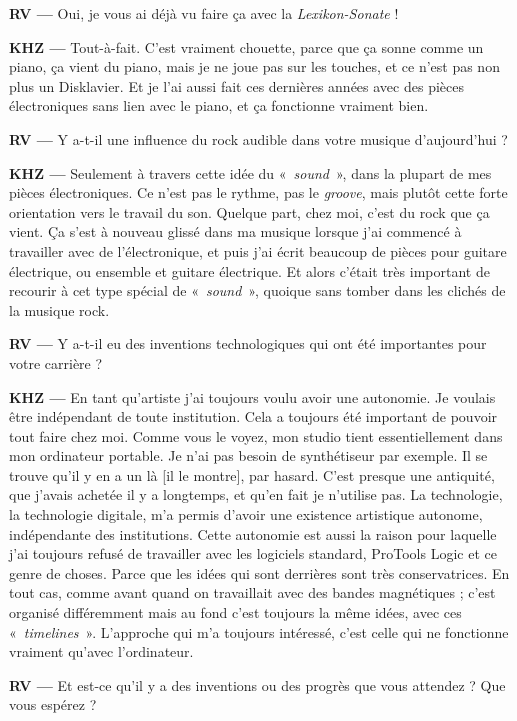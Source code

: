 \documentclass[a4paper,12pt]{article}
\newcommand{\guill}[1]{«~#1~»}
\begin{document}
\textbf{RV ---} Oui, je vous ai déjà vu faire ça avec la \emph{Lexikon-Sonate} !

\textbf{KHZ ---} Tout-à-fait. C'est vraiment chouette, parce que ça sonne comme un piano, ça vient du piano, mais je ne joue pas sur les touches, et ce n'est pas non plus un Disklavier. Et je l'ai aussi fait ces dernières années avec des pièces électroniques sans lien avec le piano, et ça fonctionne vraiment bien.

\textbf{RV ---} Y a-t-il une influence du rock audible dans votre musique d'aujourd'hui ?

\textbf{KHZ ---} Seulement à travers cette idée du \guill{\emph{sound}}, dans la plupart de mes pièces électroniques. Ce n'est pas le rythme, pas le \emph{groove}, mais plutôt cette forte orientation vers le travail du son. Quelque part, chez moi, c'est du rock que ça vient. Ça s'est à nouveau glissé dans ma musique lorsque j'ai commencé à travailler avec de l'électronique, et puis j'ai écrit beaucoup de pièces pour guitare électrique, ou ensemble et guitare électrique. Et alors c'était très important de recourir à cet type spécial de \guill{\emph{sound}}, quoique sans tomber dans les clichés de la musique rock.

\textbf{RV ---} Y a-t-il eu des inventions technologiques qui ont été importantes pour votre carrière ?

\textbf{KHZ ---} En tant qu'artiste j'ai toujours voulu avoir une autonomie. Je voulais être indépendant de toute institution. Cela a toujours été important de pouvoir tout faire chez moi. Comme vous le voyez, mon studio tient essentiellement dans mon ordinateur portable. Je n'ai pas besoin de synthétiseur par exemple. Il se trouve qu'il y en a un là [il le montre], par hasard. C'est presque une antiquité, que j'avais achetée il y a longtemps, et qu'en fait je n'utilise pas. La technologie, la technologie digitale, m'a permis d'avoir une existence artistique autonome, indépendante des institutions. Cette autonomie est aussi la raison pour laquelle j'ai toujours refusé de travailler avec les logiciels standard, ProTools Logic et ce genre de choses. Parce que les idées qui sont derrières sont très conservatrices. En tout cas, comme avant quand on travaillait avec des bandes magnétiques ; c'est organisé différemment mais au fond c'est toujours la même idées, avec ces \guill{\emph{timelines}}. L'approche qui m'a toujours intéressé, c'est celle qui ne fonctionne vraiment qu'avec l'ordinateur.

\textbf{RV ---} Et est-ce qu'il y a des inventions ou des progrès que vous attendez ? Que vous espérez ?
\end{document}

